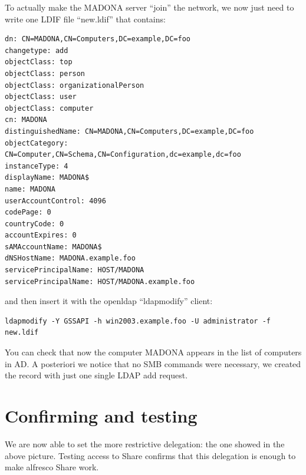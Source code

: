 \documentclass[12pt,a4]{article}
\begin{document}
To actually make the MADONA server ``join'' the network, we now just need to write one LDIF file ``new.ldif'' that contains:
\begin{verbatim}
dn: CN=MADONA,CN=Computers,DC=example,DC=foo
changetype: add
objectClass: top
objectClass: person
objectClass: organizationalPerson
objectClass: user
objectClass: computer
cn: MADONA
distinguishedName: CN=MADONA,CN=Computers,DC=example,DC=foo
objectCategory: CN=Computer,CN=Schema,CN=Configuration,dc=example,dc=foo
instanceType: 4
displayName: MADONA$
name: MADONA
userAccountControl: 4096
codePage: 0
countryCode: 0
accountExpires: 0
sAMAccountName: MADONA$
dNSHostName: MADONA.example.foo
servicePrincipalName: HOST/MADONA
servicePrincipalName: HOST/MADONA.example.foo
\end{verbatim}
and then insert it with the openldap ``ldapmodify'' client:
\begin{verbatim}
ldapmodify -Y GSSAPI -h win2003.example.foo -U administrator -f new.ldif
\end{verbatim}

You can check that now the computer MADONA appears in the list of computers in AD.
A posteriori we notice that no SMB commands were necessary, we created the record with just one single LDAP add request.


\section{Confirming and testing}
We are now able to set the more restrictive delegation: the one showed in the above picture.
Testing access to Share confirms that this delegation is enough to make alfresco Share work.
\end{document}
